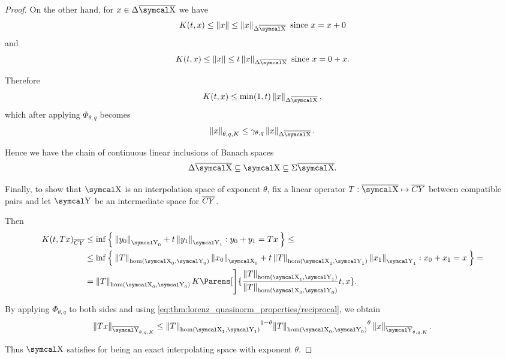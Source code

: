 \begin{proof}
  On the other hand, for \( x \in \Delta \Ol{\CX} \) we have
  \begin{equation*}
    K(t, x) \leq \Norm{x} \leq \Norm{x}_{\Delta \Ol{\CX}} \T{since} x = x + 0
  \end{equation*}
  and
  \begin{equation*}
    K(t, x) \leq \Norm{x} \leq t \Norm{x}_{\Delta \Ol{\CX}} \T{since} x = 0 + x.
  \end{equation*}

  Therefore
  \begin{equation*}
    K(t, x) \leq \min(1, t) \Norm{x}_{\Delta \Ol{\CX}},
  \end{equation*}
  which after applying \( \Phi_{\theta,q} \) becomes
  \begin{equation*}
    \Norm{x}_{\theta,q,K} \leq \gamma_{\theta,q} \Norm{x}_{\Delta \Ol{\CX}}.
  \end{equation*}

  Hence we have the chain of continuous linear inclusions of Banach spaces
  \begin{equation*}
    \Delta \Ol{\CX} \subseteq \CX \subseteq \Sigma \Ol{\CX}.
  \end{equation*}

  Finally, to show that \( \CX \) is an interpolation space of exponent \( \theta \), fix a linear operator \( T: \Ol{\CX} \mapsto \Ol{CY} \) between compatible pairs and let \( \CY \) be an intermediate space for \( \overline{CY} \).

  Then
  \begin{align*}
    K(t, Tx)_{\Ol{CY}}
    &\leq
    \inf \Set{ \Norm{y_0}_{\CY_0} + t \Norm{y_1}_{\CY_1} : y_0 + y_1 = Tx }
    \leq \\ &\leq
    \inf \Set{ \Norm{T}_{\hom(\CX_0, \CY_0)} \Norm{x_0}_{\CX_0} + t \Norm{T}_{\hom(\CX_1, \CY_1)} \Norm{x_1}_{\CY_1} : x_0 + x_1 = x }
    = \\ &=
    \Norm{T}_{\hom(\CX_0, \CY_0)} K\Parens[\Bigg]{\frac {\Norm{T}_{\hom(\CX_1, \CY_1)}} {\Norm{T}_{\hom(\CX_0, \CY_0)}} t, x}.
  \end{align*}

  By applying \( \Phi_{\theta,q} \) to both sides and using \eqref{eq:thm:lorenz_quasinorm_properties/reciprocal}, we obtain
  \begin{equation*}
    \Norm{Tx}_{\Ol{\CY}_{\theta,q,K}}
    \leq
    {\Norm{T}_{\hom(\CX_1, \CY_1)}}^{1 - \theta} {\Norm{T}_{\hom(\CX_0, \CY_0)}}^{\theta} \Norm{x}_{\Ol{\CY}_{\theta,q,K}}.
  \end{equation*}

  Thus \( \CX \) satisfies  for being an exact interpolating space with exponent \( \theta \).
\end{proof}

